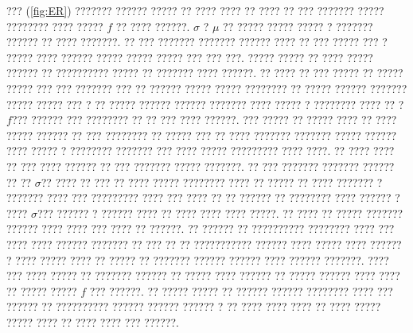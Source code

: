 ??? (\ref{fig:ER}) ??????? ?????? ????? ?? ???? ???? ?? ???? ?? ??? ??????? ????? ???????? ???? ????? $f$ ?? ???? ??????. $\sigma$ ? $\mu$ ?? ????? ????? ????? ? ??????? ?????? ?? ???? ???????.  ?? ??? ??????? ??????? ?????? ???? ?? ??? ????? ??? ? ????? ???? ?????? ????? ????? ????? ??? ??? ???. ????? ????? ?? ???? ????? ?????? ?? ?????????? ????? ?? ??????? ???? ??????. ?? ???? ?? ??? ????? ?? ????? ????? ??? ??? ??????? ??? ?? ?????? ????? ????? ???????? ?? ????? ?????? ??????? ????? ????? ??? ? ?? ?????  ?????? ?????? ??????? ???? ????? ? ???????? ???? ?? ?$f$??? ?????? ??? ???????? ?? ?? ??? ???? ??????.  ??? ????? ?? ????? ???? ?? ???? ????? ?????? ?? ??? ???????? ?? ????? ??? ?? ???? ??????? ??????? ????? ?????? ???? ????? ? ???????? ??????? ??? ???? ????? ????????? ???? ????. ?? ???? ???? ?? ??? ???? ?????? ?? ??? ??????? ????? ???????. ?? ??? ??????? ??????? ?????? ?? ??  $\sigma$?? ???? ?? ??? ?? ???? ????? ???????? ????  ?? ????? ?? ???? ??????? ? ??????? ???? ??? ????????? ???? ??? ???? ?? ?? ?????? ?? ???????? ???? ?????? ? ????  $\sigma$??? ?????? ? ?????? ???? ??  ???? ???? ???? ?????. ?? ???? ?? ????? ??????? ?????? ???? ???? ??? ???? ?? ??????. ?? ?????? ?? ?????????? ???????? ???? ??? ???? ???? ?????? ??????? ?? ??? ?? ?? ??????????? ?????? ???? ????? ???? ?????? ? ???? ????? ???? ?? ????? ?? ??????? ?????? ?????? ???? ?????? ???????. ???? ??? ???? ????? ?? ??????? ?????? ?? ????? ???? ?????? ?? ????? ?????? ???? ???? ?? ????? ????? $f$ ??? ??????. ?? ????? ????? ?? ?????? ?????? ???????? ???? ??? ?????? ?? ?????????? ?????? ?????? ?????? ? ?? ???? ???? ???? ?? ???? ????? ????? ???? ?? ???? ???? ??? ??????.

